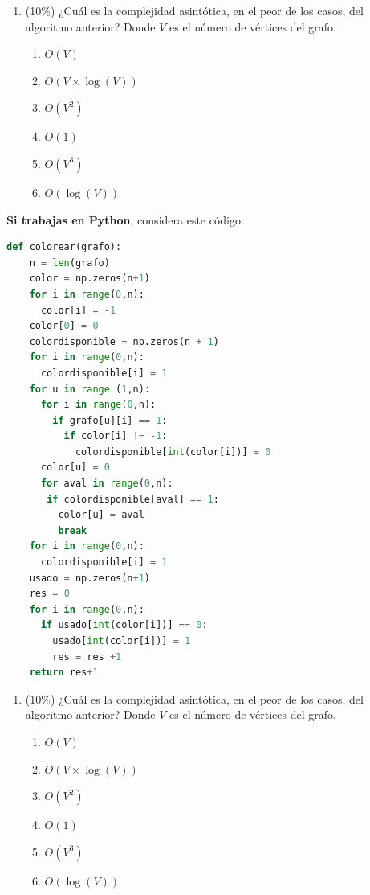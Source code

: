\documentclass[10 pt]{article}
\begin{document}
  \begin{enumerate}[label=(\Alph*)]
    \item (10\%) ¿Cuál es la complejidad asintótica, en el peor de los casos, del algoritmo anterior? Donde $V$ es el número de vértices del grafo.
    \begin{enumerate}[label=\roman*)]
      \item $O(V)$
      \item $O(V \times \log(V))$
      \item $O(V^2)$
      \item $O(1)$
      \item $O(V^3)$
      \item $O(\log(V))$
    \end{enumerate}
  \end{enumerate}



\newpage

\textbf{Si trabajas en Python}, considera este código:


\begin{lstlisting}[language = python]
def colorear(grafo):
    n = len(grafo)
    color = np.zeros(n+1)
    for i in range(0,n):
      color[i] = -1
    color[0] = 0
    colordisponible = np.zeros(n + 1)
    for i in range(0,n):
      colordisponible[i] = 1
    for u in range (1,n):
      for i in range(0,n):
        if grafo[u][i] == 1:
          if color[i] != -1:
            colordisponible[int(color[i])] = 0
      color[u] = 0
      for aval in range(0,n):
       if colordisponible[aval] == 1:
         color[u] = aval
         break     
    for i in range(0,n):
      colordisponible[i] = 1
    usado = np.zeros(n+1)
    res = 0
    for i in range(0,n):
      if usado[int(color[i])] == 0:
        usado[int(color[i])] = 1 
        res = res +1
    return res+1
  \end{lstlisting}
  \begin{enumerate}[label=(\Alph*)]
    \item (10\%) ¿Cuál es la complejidad asintótica, en el peor de los casos, del algoritmo anterior? Donde $V$ es el número de vértices del grafo.
    \begin{enumerate}[label=\roman*)]
      \item $O(V)$
      \item $O(V \times \log(V))$
      \item $O(V^2)$
      \item $O(1)$
      \item $O(V^3)$
      \item $O(\log(V))$
    \end{enumerate}
  \end{enumerate}
\end{document}
